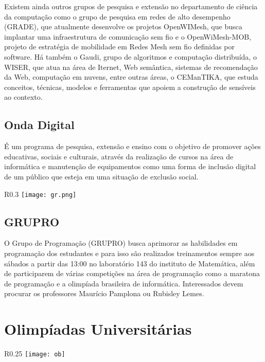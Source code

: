         \par Existem ainda outros grupos de pesquisa e extensão no departamento de ciência da computação como o grupo de pesquisa em redes de alto desempenho (GRADE), que atualmente desenvolve os projetos OpenWIMesh, que busca implantar uma infraestrutura de comunicação sem fio e o OpenWiMesh-MOB, projeto de estratégia de mobilidade em Redes Mesh sem fio definidas por software. Há também o Gaudi, grupo de algoritmos e computação distribuída, o WISER, que atua na área de Iternet, Web semântica, sistemas de recomendação da Web, computação em nuvens, entre outras áreas, o CEManTIKA, que estuda conceitos, técnicas, modelos e ferramentas que apoiem a construção de sensíveis ao contexto.
    
    \subsection{Onda Digital}
        \par É um programa de pesquisa, extensão e ensino com o objetivo de promover ações educativas, sociais e culturais, através da realização de cursos na área de informática e manutenção de equipamentos como uma forma de inclusão digital de um público que esteja em uma situação de exclusão social.
        
        \begin{wrapfigure}{R}{0.3\textwidth}
            \centering
            \texttt{[image: gr.png]}
        \end{wrapfigure}
    \subsection{GRUPRO}
        \par O Grupo de Programação (GRUPRO) busca aprimorar as habilidades em programação dos estudantes e para isso são realizados treinamentos sempre aos sábados a partir das 13:00 no laboratório 143 do instituto de Matemática, além de participarem de várias competições na área de programação como a maratona de programação e a olimpíada brasileira de informática. Interessados devem procurar os professores Maurício Pamplona ou Rubisley Lemes.
        
    
\section{Olimpíadas Universitárias}
\begin{wrapfigure}{R}{0.25\textwidth}
            \centering
            \texttt{[image: ob]}
\end{wrapfigure}
